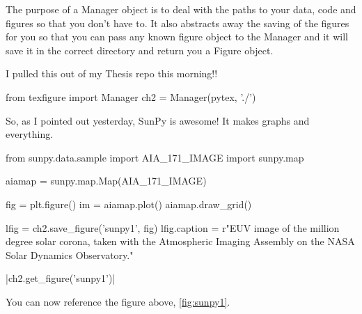 \documentclass[]{article}
\begin{document}
The purpose of a Manager object is to deal with the paths to your data, code and
figures so that you don't have to. It also abstracts away the saving of the
figures for you so that you can pass any known figure object to the Manager and
it will save it in the correct directory and return you a Figure object.




I pulled this out of my Thesis repo this morning!!

\begin{pycode}[chapter2]
from texfigure import Manager
ch2 = Manager(pytex, './')
\end{pycode}

So, as I pointed out yesterday, SunPy is awesome! It makes graphs and everything.

\begin{pycode}[chapter2]
from sunpy.data.sample import AIA_171_IMAGE
import sunpy.map

aiamap = sunpy.map.Map(AIA_171_IMAGE)

fig = plt.figure()
im = aiamap.plot()
aiamap.draw_grid()

lfig = ch2.save_figure('sunpy1', fig)
lfig.caption = r"EUV image of the million degree solar corona, taken with the Atmospheric Imaging Assembly on the NASA Solar Dynamics Observatory."
\end{pycode}

\py[chapter2]|ch2.get_figure('sunpy1')|

You can now reference the figure above, \ref{fig:sunpy1}.
\end{document}
